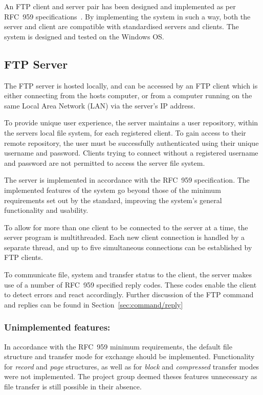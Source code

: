 \documentclass[10pt,twocolumn]{witseiepaper}
\begin{document}
An FTP client and server pair has been designed and implemented as per RFC~959 specifications~\cite{rfc959}. By implementing the system in such a way, both the server and client are compatible with standardised servers and clients. The system is designed and tested on the  Windows OS.

\subsection{FTP Server}

The FTP server is hosted locally, and can be accessed by an FTP client which is either connecting from the hosts computer, or from a computer running on the same Local Area Network (LAN) via the server's IP address. 

To provide unique user experience, the server maintains a user repository, within the servers local file system, for each registered client. To gain access to their remote repository, the user must be successfully authenticated using their unique username and password. Clients trying to connect without a registered username and password are not permitted to access the server file system.

The server is implemented in accordance with the RFC~959 specification. The implemented features of the system go beyond those of the minimum requirements set out by the standard, improving the system's general functionality and usability. 

To allow for more than one client to be connected to the server at a time, the server program is multithreaded. Each new client connection is handled by a separate thread, and up to five simultaneous connections can be established by FTP clients. 

To communicate file, system and transfer status to the client, the server makes use of a number of RFC~959 specified reply codes. These codes enable the client to detect errors and react accordingly. Further discussion of the FTP command and replies can be found in Section~\ref{sec:command/reply}

\vspace*{-2mm}
\subsubsection*{Unimplemented features: }
In accordance with the RFC~959 minimum requirements, the default file structure and transfer mode for exchange should be implemented. Functionality for \textit{record} and \textit{page} structures, as well as for \textit{block} and \textit{compressed} transfer modes were not implemented. The project group deemed theses features unnecessary as file transfer is still possible in their absence.
\end{document}
